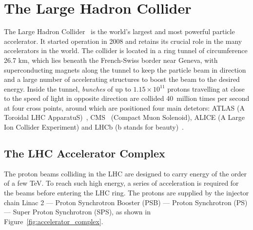\section{The Large Hadron Collider}
The Large Hadron Collider~\cite{Evans:2008zzb} is the world's 
largest and most powerful particle accelerator. 
It started operation in 2008 and retains its crucial role in the many 
accelerators in the world.
The collider is located in a ring tunnel of 
circumference 26.7 km, which lies beneath the 
French-Swiss border near Geneva, with superconducting magnets 
along the tunnel to keep the particle beam in direction
and a large number of accelerating structures to boost the 
beam to the desired energy.
Inside the tunnel, \textit{bunches} of up to $1.15 \times 10^{11}$ protons
travelling at close to the speed of light in opposite direction 
are collided 40~million times per second at four cross points,
around which are positioned four main detetors: 
ATLAS (A Toroidal LHC ApparatuS)~\cite{PERF-2007-01}, 
CMS~\cite{CMS-2008xjf} (Compact Muon Solenoid), ALICE (A Large Ion Collider Experiment) 
\cite{ALICE-2008ngc} and LHCb (b stands for beauty)~\cite{LHCb-2008vvz}.




	
\subsection{The LHC Accelerator Complex}

The proton beams colliding in the LHC are designed to carry energy 
of the order of a few TeV. To reach such high energy, a series of 
acceleration is required for the beams before entering the LHC ring. 
The protons are supplied by the injector chain Linac 2 — Proton Synchrotron 
Booster (PSB) — Proton Synchrotron (PS) — Super Proton Synchrotron (SPS), 
as shown in Figure~\ref{fig:accelerator_complex}.

